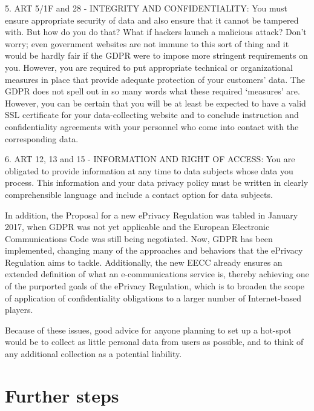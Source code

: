 \documentclass[12pt]{amsart}
\begin{document}
\begin{multicols}{2}
\vspace{0.35cm}
5. ART 5/1F and 28 - INTEGRITY AND CONFIDENTIALITY: You must ensure
appropriate security of data and also ensure that it cannot be
tampered with. But how do you do that? What if hackers launch a
malicious attack? Don’t worry; even government websites are not immune
to this sort of thing and it would be hardly fair if the GDPR were to
impose more stringent requirements on you. However, you are required
to put appropriate technical or organizational measures in place that
provide adequate protection of your customers’ data. The GDPR does not
spell out in so many words what these required ‘measures’
are. However, you can be certain that you will be at least be expected
to have a valid SSL certificate for your data-collecting website and
to conclude instruction and confidentiality agreements with your
personnel who come into contact with the corresponding data.

\vspace{0.35cm}
6. ART
12, 13 and 15 - INFORMATION AND RIGHT OF ACCESS: You are obligated to
provide information at any time to data subjects whose data you
process. This information and your data privacy policy must be written
in clearly comprehensible language and include a contact option for
data subjects.


\vspace{0.35cm}

In addition, the Proposal for a new ePrivacy
Regulation was tabled in January 2017, when GDPR was not yet
applicable and the European Electronic Communications Code\cite{eecc18}
was still being negotiated. Now, GDPR has been implemented,
changing many of the approaches and behaviors that the ePrivacy
Regulation aims to tackle. Additionally, the new EECC already ensures
an extended definition of what an e-communications service is, thereby
achieving one of the purported goals of the ePrivacy Regulation, which
is to broaden the scope of application of confidentiality obligations
to a larger number of Internet-based players.


\vspace{0.35cm} Because of these issues, good advice for anyone
planning to set up a hot-spot would be to collect as little personal
data from users as possible, and to think of any additional collection
as a potential liability.

\section{Further steps}


\end{multicols}
\end{document}
